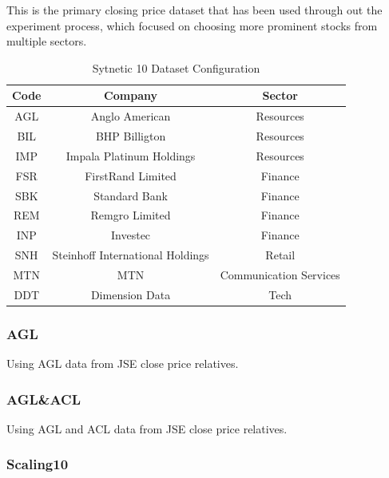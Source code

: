 \documentclass[a4paper,11pt,oneside]{article}
\theoremstyle{plain}
\theoremstyle{definition}
\begin{document}
This is the primary closing price dataset that has been used through out the experiment process, which focused on choosing more prominent stocks from multiple sectors.

\begin{table}[H]
	\centering
	\begin{tabular}{|c|c|c|}
		\hline
		\textbf{Code} &\textbf{Company} & \textbf{Sector} \\\hline	
		{AGL} & {Anglo American} & {Resources}  \\\hline
		{BIL} & {BHP Billigton} & {Resources}  \\\hline
		{IMP} & {Impala Platinum Holdings} & {Resources}  \\\hline
		{FSR} & {FirstRand Limited} & {Finance}  \\\hline
		{SBK} & {Standard Bank} & {Finance}  \\\hline
		{REM} & {Remgro Limited} & {Finance}  \\\hline
		{INP} & {Investec} & {Finance}  \\\hline
		{SNH} & {Steinhoff International Holdings} & {Retail}    \\\hline
		{MTN} & {MTN} & {Communication Services}  \\\hline
		{DDT} & {Dimension Data} & {Tech} \\\hline
	\end{tabular}
	\newline\newline
	\caption{Sytnetic 10 Dataset Configuration}\label{tab_actual10}
\end{table}


\subsubsection{AGL}\label{dataset_agl}

Using AGL data from JSE close price relatives.

\subsubsection{AGL\&ACL}\label{dataset_aglacl}

Using AGL and ACL data from JSE close price relatives.

\subsubsection{Scaling10}\label{dataset_scaling10}
\end{document}
